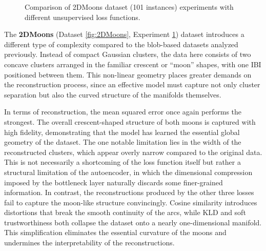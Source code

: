 \begin{figure}[htbp]
  \caption{Comparison of 2DMoons dataset (101 instances) experiments with different unsupervised loss functions.}
  \label{fig:RQ2/2DMoons}
\end{figure}

The \textbf{2DMoons} (Dataset \ref{fig:2DMoons}, Experiment \ref{fig:RQ2/2DMoons}) dataset introduces a different type of complexity compared to the blob-based datasets analyzed previously. Instead of compact Gaussian clusters, the data here consists of two concave clusters arranged in the familiar crescent or “moon” shapes, with one IBI positioned between them. This non-linear geometry places greater demands on the reconstruction process, since an effective model must capture not only cluster separation but also the curved structure of the manifolds themselves.

In terms of reconstruction, the mean squared error once again performs the strongest. The overall crescent-shaped structure of both moons is captured with high fidelity, demonstrating that the model has learned the essential global geometry of the dataset. The one notable limitation lies in the width of the reconstructed clusters, which appear overly narrow compared to the original data. This is not necessarily a shortcoming of the loss function itself but rather a structural limitation of the autoencoder, in which the dimensional compression imposed by the bottleneck layer naturally discards some finer-grained information. In contrast, the reconstructions produced by the other three losses fail to capture the moon-like structure convincingly. Cosine similarity introduces distortions that break the smooth continuity of the arcs, while KLD and soft trustworthiness both collapse the dataset onto a nearly one-dimensional manifold. This simplification eliminates the essential curvature of the moons and undermines the interpretability of the reconstructions.

